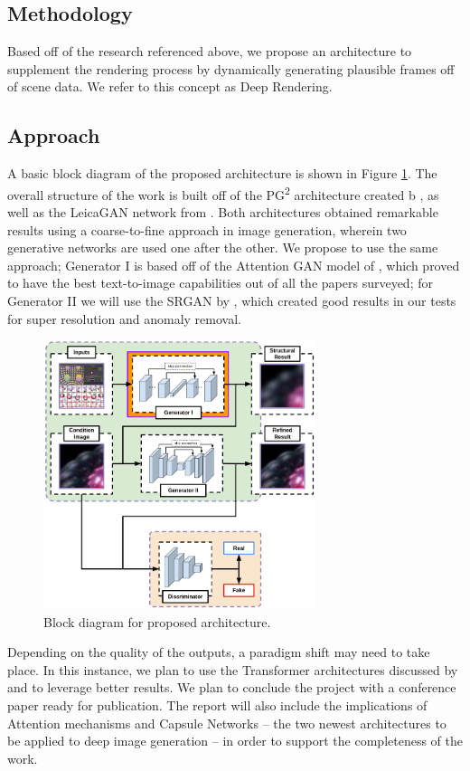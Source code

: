 \documentclass{article}
\begin{document}
\subsection{Methodology}
\label{subsec:methodology}
Based off of the research referenced above,
we propose an architecture to supplement the rendering process by dynamically
generating plausible frames off of scene data. We refer to this concept as
Deep Rendering.

\subsection{Approach}
\label{subsec:approach}
A basic block diagram of the proposed architecture is shown
in Figure \ref{fig:block_diagram}. The overall structure of the work is
built off of the PG\textsuperscript{2} architecture created b
\cite{pose_guided_image_generation}, as well as the LeicaGAN network
from \cite{leica}. Both architectures obtained remarkable results using
a coarse-to-fine approach in image generation, wherein two generative networks
are used one after the other. We propose to use the same approach;
Generator I is based off of the Attention GAN model of \cite{leica},
which proved to have the best text-to-image capabilities out of all the papers
surveyed; for Generator II we will use the SRGAN by \cite{srgan}, which
created good results in our tests for super resolution and anomaly removal.

\begin{figure}[htbp]
\centerline{\includegraphics[width=8cm]{block_diagram.png}}
\caption{Block diagram for proposed architecture.}
\label{fig:block_diagram}
\end{figure}

Depending on the quality of the outputs, a paradigm shift may need to take place.
In this instance, we plan to use the Transformer architectures discussed by
\cite{image_transformer} and \cite{sparse_transformers} to leverage better
results. We plan to conclude the project with a conference paper ready for
publication. The report will also include the implications of Attention
mechanisms and Capsule Networks -- the two newest architectures to be applied
to deep image generation -- in order to support the completeness
of the work.
\end{document}
